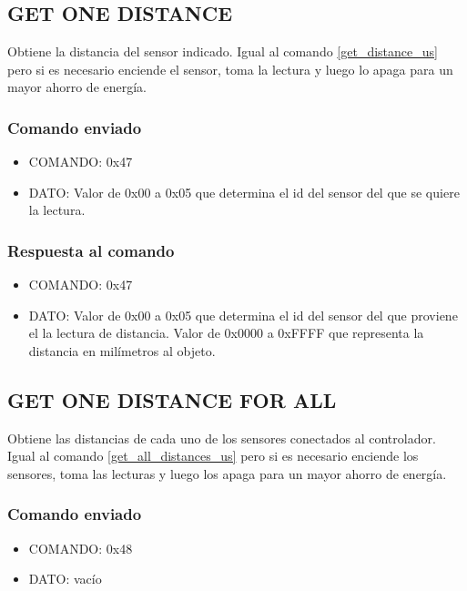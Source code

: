 \documentclass[a4paper,10pt]{article}
\begin{document}
\subsection{GET ONE DISTANCE}
\label{get_one_distance_us}

Obtiene la distancia del sensor indicado.
Igual al comando \ref{get_distance_us} pero si es necesario enciende el sensor, toma la lectura y luego lo apaga para un mayor ahorro de energ\'ia.

\subsubsection*{Comando enviado}

\begin{itemize}
	\item{COMANDO:} 0x47
	\item{DATO:} Valor de 0x00 a 0x05 que determina el id del sensor del que se quiere la lectura.
\end{itemize}

\subsubsection*{Respuesta al comando}

\begin{itemize}
	\item{COMANDO:} 0x47
	\item{DATO:} Valor de 0x00 a 0x05 que determina el id del sensor del que proviene el la lectura de distancia.
	Valor de 0x0000 a 0xFFFF que representa la distancia en mil\'imetros al objeto.
\end{itemize}

\subsection{GET ONE DISTANCE FOR ALL}
\label{get_one_distance_for_all_us}

Obtiene las distancias de cada uno de los sensores conectados al controlador.
Igual al comando \ref{get_all_distances_us} pero si es necesario enciende los sensores, toma las lecturas y luego los apaga para un mayor ahorro de energ\'ia.

\subsubsection*{Comando enviado}

\begin{itemize}
	\item{COMANDO:} 0x48
	\item{DATO:} vac\'io
\end{itemize}
\end{document}

